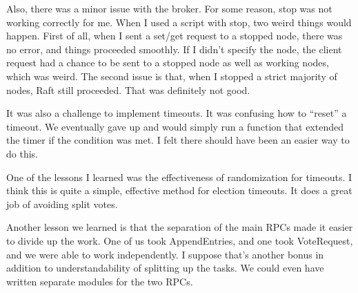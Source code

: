 \documentclass{article}
\begin{document}
Also, there was a minor issue with the broker. For some reason, stop was not working correctly for me. When I used a script with stop, two weird things would happen. First of all, when I sent a set/get request to a stopped node, there was no error, and things proceeded smoothly. If I didn't specify the node, the client request had a chance to be sent to a stopped node as well as working nodes, which was weird. The second issue is that, when I stopped a strict majority of nodes, Raft still proceeded. That was definitely not good.

It was also a challenge to implement timeouts. It was confusing how to ``reset'' a timeout. We eventually gave up and would simply run a function that extended the timer if the condition was met. I felt there should have been an easier way to do this.

One of the lessons I learned was the effectiveness of randomization for timeouts. I think this is quite a simple, effective method for election timeouts. It does a great job of avoiding split votes.

Another lesson we learned is that the separation of the main RPCs made it easier to divide up the work. One of us took AppendEntries, and one took VoteRequest, and we were able to work independently. I suppose that's another bonus in addition to understandability of splitting up the tasks. We could even have written separate modules for the two RPCs.
\end{document}
